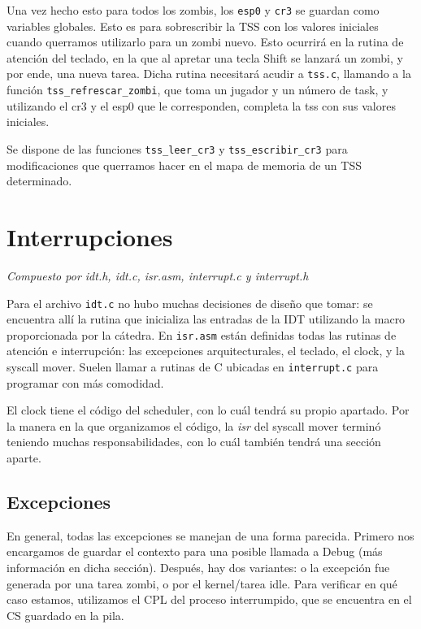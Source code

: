 \documentclass{article}
\begin{document}
	Una vez hecho esto para todos los zombis, los \texttt{esp0} y \texttt{cr3} se guardan como variables globales. Esto es para sobrescribir la TSS con los valores iniciales cuando querramos utilizarlo para un zombi nuevo. Esto ocurrirá en la rutina de atención del teclado, en la que al apretar una tecla Shift se lanzará un zombi, y por ende, una nueva tarea. Dicha rutina necesitará acudir a \texttt{tss.c}, llamando a la función \texttt{tss\_refrescar\_zombi}, que toma un jugador y un número de task, y utilizando el cr3 y el esp0 que le corresponden, completa la tss con sus valores iniciales.

	Se dispone de las funciones \texttt{tss\_leer\_cr3} y \texttt{tss\_escribir\_cr3} para modificaciones que querramos hacer en el mapa de memoria de un TSS determinado.


	\section{Interrupciones}
	\vspace{-1cm}
	\begin{flushright}
	\textit{Compuesto por idt.h, idt.c, isr.asm, interrupt.c y interrupt.h}
	\end{flushright}

	Para el archivo \texttt{idt.c} no hubo muchas decisiones de diseño que tomar: se encuentra allí la rutina que inicializa las entradas de la IDT utilizando la macro proporcionada por la cátedra. En \texttt{isr.asm} están definidas todas las rutinas de atención e interrupción: las excepciones arquitecturales, el teclado, el clock, y la syscall mover. Suelen llamar a rutinas de C ubicadas en \texttt{interrupt.c} para programar con más comodidad.

	El clock tiene el código del scheduler, con lo cuál tendrá su propio apartado. Por la manera en la que organizamos el código, la \textit{isr} del syscall mover terminó teniendo muchas responsabilidades, con lo cuál también tendrá una sección aparte.

	\subsection*{Excepciones}

	En general, todas las excepciones se manejan de una forma parecida. Primero nos encargamos de guardar el contexto para una posible llamada a Debug (más información en dicha sección). Después, hay dos variantes: o la excepción fue generada por una tarea zombi, o por el kernel/tarea idle. Para verificar en qué caso estamos, utilizamos el CPL del proceso interrumpido, que se encuentra en el CS guardado en la pila.
\end{document}
